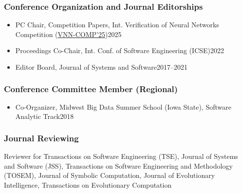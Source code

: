 \documentclass[11pt]{article}
\begin{document}
\subsubsection{Conference Organization and Journal Editorships}
\begin{itemize}
    \item PC Chair, Competition Papers, Int. Verification of Neural Networks Competition (\href{https://sites.google.com/view/vnn2025}{VNN-COMP'25})\hfill 2025
    \item Proceedings Co-Chair,  Int. Conf. of Software Engineering (ICSE)\hfill 2022
    \item Editor Board, Journal of Systems and Software\hfill 2017--2021
\end{itemize}

\subsubsection{Conference Committee Member (Regional)}

\begin{itemize}
    \item Co-Organizer, Midwest Big Data Summer School (Iowa State), Software Analytic Track\hfill 2018
\end{itemize}


\subsubsection{Journal Reviewing}
\begin{description}
    \item Reviewer for  Transactions on Software Engineering (TSE), Journal of Systems and Software (JSS), Transactions on Software Engineering and Methodology (TOSEM), Journal of Symbolic Computation, Journal of Evolutionary Intelligence, Transactions on Evolutionary Computation
\end{description}
\end{document}

